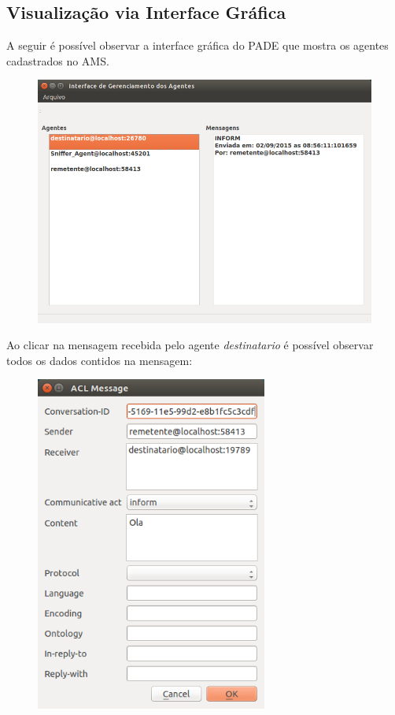 \documentclass[letterpaper,10pt,brazil]{sphinxmanual}
\begin{document}
\subsection{Visualização via Interface Gráfica}
\label{user/recebendo-mensagens:visualizacao-via-interface-grafica}
A seguir é possível observar a interface gráfica do PADE que mostra os agentes cadastrados no AMS.
\begin{figure}[htbp]
\centering

\includegraphics[width=4.5in]{janela_agentes.png}
\end{figure}

Ao clicar na mensagem recebida pelo agente \emph{destinatario} é possível observar todos os dados contidos na mensagem:
\begin{figure}[htbp]
\centering

\includegraphics[width=3.0in]{janela_mensagem.png}
\end{figure}
\end{document}
